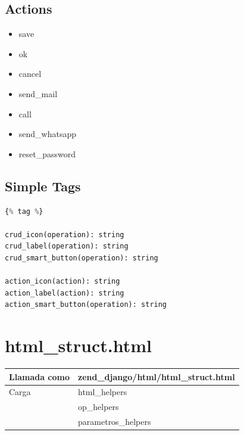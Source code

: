 \subsection{Actions}

\begin{itemize}
	\item save
	\item ok
	\item cancel
	\item send\_mail
	\item call
	\item send\_whatsapp
	\item reset\_password
\end{itemize}

\subsection{Simple Tags}

\begin{lstlisting}[language=Python]
{% tag %}

crud_icon(operation): string
crud_label(operation): string
crud_smart_button(operation): string

action_icon(action): string
action_label(action): string
action_smart_button(operation): string
\end{lstlisting}

\section{html\_struct.html}

\begin{tabular}{|l|l|}
	\hline
	Llamada como & zend\_django/html/html\_struct.html \\
	\hline
	Carga & html\_helpers \\
	& op\_helpers \\
	& parametros\_helpers \\
	\hline
\end{tabular}


